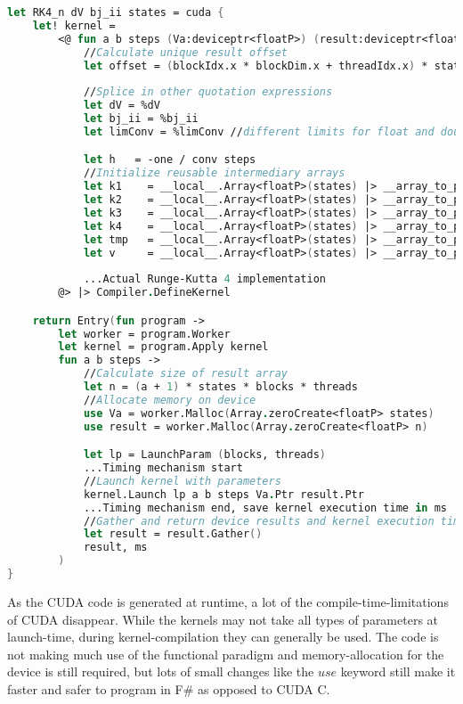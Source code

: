 \begin{lstlisting}[language=FSharp, caption=The Runge-Kutta 4 solver expressed in F\# Alea.cuBase, label=cubase_rk4_n_snippet]
let RK4_n dV bj_ii states = cuda {
	let! kernel =
		<@ fun a b steps (Va:deviceptr<floatP>) (result:deviceptr<floatP>) ->
			//Calculate unique result offset
			let offset = (blockIdx.x * blockDim.x + threadIdx.x) * states * (a + 1)
            
			//Splice in other quotation expressions
			let dV = %dV
			let bj_ii = %bj_ii
			let limConv = %limConv //different limits for float and double

			let h   = -one / conv steps
			//Initialize reusable intermediary arrays
			let k1	  = __local__.Array<floatP>(states) |> __array_to_ptr
			let k2	  = __local__.Array<floatP>(states) |> __array_to_ptr
			let k3	  = __local__.Array<floatP>(states) |> __array_to_ptr
			let k4	  = __local__.Array<floatP>(states) |> __array_to_ptr
			let tmp	  = __local__.Array<floatP>(states) |> __array_to_ptr
			let v	  = __local__.Array<floatP>(states) |> __array_to_ptr
            
            ...Actual Runge-Kutta 4 implementation
        @> |> Compiler.DefineKernel 

    return Entry(fun program ->
        let worker = program.Worker
        let kernel = program.Apply kernel
        fun a b steps ->
            //Calculate size of result array
            let n = (a + 1) * states * blocks * threads
			//Allocate memory on device
            use Va = worker.Malloc(Array.zeroCreate<floatP> states)
            use result = worker.Malloc(Array.zeroCreate<floatP> n)

            let lp = LaunchParam (blocks, threads)
            ...Timing mechanism start
            //Launch kernel with parameters
            kernel.Launch lp a b steps Va.Ptr result.Ptr
            ...Timing mechanism end, save kernel execution time in ms
            //Gather and return device results and kernel execution time
            let result = result.Gather()
            result, ms
        )
}
\end{lstlisting}

As the CUDA code is generated at runtime, a lot of the compile-time-limitations of CUDA disappear.
While the kernels may not take all types of parameters at launch-time, during kernel-compilation they can generally be used.
The code is not making much use of the functional paradigm and memory-allocation for the device is still required, but lots of small changes like the $use$ keyword still make it faster and safer to program in F\# as opposed to CUDA C.

